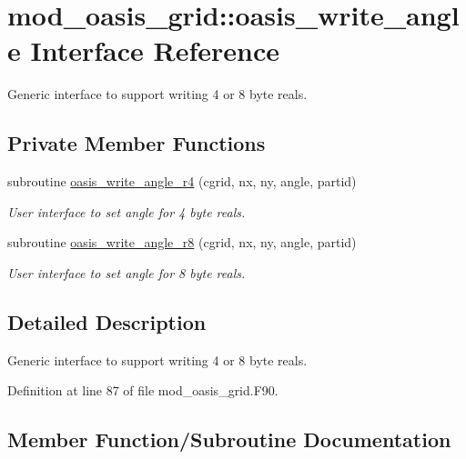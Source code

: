 \hypertarget{interfacemod__oasis__grid_1_1oasis__write__angle}{}\section{mod\+\_\+oasis\+\_\+grid\+:\+:oasis\+\_\+write\+\_\+angle Interface Reference}
\label{interfacemod__oasis__grid_1_1oasis__write__angle}


Generic interface to support writing 4 or 8 byte reals.  


\subsection*{Private Member Functions}
\begin{DoxyCompactItemize}
\item 
subroutine \hyperlink{interfacemod__oasis__grid_1_1oasis__write__angle_ad29c223ca87f1f54d042bce0a9b9e90d}{oasis\+\_\+write\+\_\+angle\+\_\+r4} (cgrid, nx, ny, angle, partid)
\begin{DoxyCompactList}\small\item\em User interface to set angle for 4 byte reals. \end{DoxyCompactList}\item 
subroutine \hyperlink{interfacemod__oasis__grid_1_1oasis__write__angle_a82a80c2eeb39ddca783d7868d92b6f6d}{oasis\+\_\+write\+\_\+angle\+\_\+r8} (cgrid, nx, ny, angle, partid)
\begin{DoxyCompactList}\small\item\em User interface to set angle for 8 byte reals. \end{DoxyCompactList}\end{DoxyCompactItemize}


\subsection{Detailed Description}
Generic interface to support writing 4 or 8 byte reals. 

Definition at line 87 of file mod\+\_\+oasis\+\_\+grid.\+F90.



\subsection{Member Function/\+Subroutine Documentation}
\mbox{\label{interfacemod__oasis__grid_1_1oasis__write__angle_ad29c223ca87f1f54d042bce0a9b9e90d}} 

